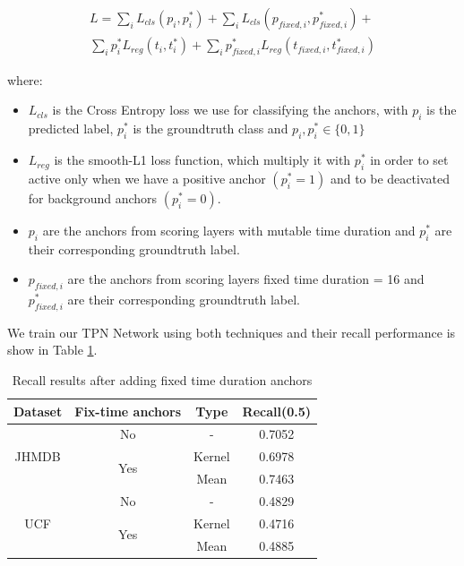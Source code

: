 \documentclass{report}
\begin{document}


\begin{equation} 
\begin{split}
 L  =  \sum_iL_{cls}(p_i, p_i^*) + \sum_iL_{cls}(p_{fixed,i}, p_{fixed,i}^*) + \\
   \sum_ip_i^*L_{reg}(t_i,t_i^*) + \sum_ip_{fixed,i}^*L_{reg}(t_{fixed,i},t_{fixed,i}^*) 
\end{split}
\end{equation}

where:
\begin{itemize}
  \item $L_{cls} $ is the Cross Entropy loss we use for classifying the anchors, with $p_i$ is the predicted label, $p_i^*$ is the groundtruth class and
  $p_i, p_i^* \in \{0,1\}$
\item $L_{reg} $ is the smooth-L1 loss function, which multiply it with $p_i^*$ in order to set active only when we have a positive anchor $(p_i^* = 1)$
  and to be deactivated for background anchors $(p_i^* = 0)$.
\item $p_i $ are the anchors from scoring layers with mutable time duration and $p_i^*$ are their corresponding groundtruth label.
\item $p_{fixed,i} $ are the anchors from scoring layers fixed time duration = 16 and $p_{fixed,i}^*$ are their corresponding groundtruth label.
\end{itemize}

We train our TPN Network using both techniques and their recall performance is show in Table \ref{table:add_16}.

\begin{table}[h]
  \centering
  \begin{tabular}{||c | c | c || c ||}
    \hline
    \textbf{Dataset} & \textbf{Fix-time anchors} & \textbf{Type} & \textbf{Recall(0.5)} \\
    \hline  \hline
    \multirow{3}{4em}{JHMDB} & No &  - & 0.7052 \\
    \cline{2-4}
    {} & \multirow{2}{*}{Yes} & Kernel & 0.6978 \\
    \cline{3-4}
    {} & {} & Mean & 0.7463 \\
    \hline
    \multirow{3}{4em}{UCF} & No & - & 0.4829 \\
    \cline{2-4}
    {} & \multirow{2}{*}{Yes} & Kernel & 0.4716 \\
    \cline{3-4}
    {} & {} & Mean & 0.4885 \\
    \hline      
  \end{tabular}
  \caption{Recall results after adding fixed time duration anchors}
  \label{table:add_16}
\end{table}
\end{document}
